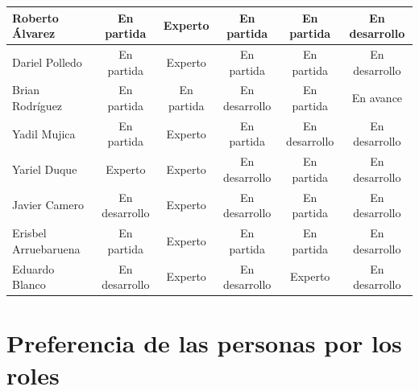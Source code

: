 {\begin{table}[H]
{\begin{tabular}{ p{2.6cm} c c c c c }
			Roberto Álvarez                       & En partida    & Experto    & En partida    & En partida    & En desarrollo \\ \hline
			Dariel Polledo                        & En partida    & Experto    & En partida    & En partida    & En desarrollo \\ \hline
			Brian Rodríguez                       & En partida    & En partida & En desarrollo & En partida    & En avance     \\ \hline
			Yadil Mujica                          & En partida    & Experto    & En partida    & En desarrollo & En desarrollo \\ \hline
			Yariel Duque                          & Experto       & Experto    & En desarrollo & En partida    & En desarrollo \\ \hline
			Javier Camero                         & En desarrollo & Experto    & En desarrollo & En partida    & En desarrollo \\ \hline
			Erisbel Arruebaruena                  & En partida    & Experto    & En partida    & En partida    & En desarrollo \\ \hline
			Eduardo Blanco                        & En desarrollo & Experto    & En desarrollo & Experto       & En desarrollo \\ \bottomrule
		\end{tabular}
	}
\end{table}

\chapter{Preferencia de las personas por los roles}

}
